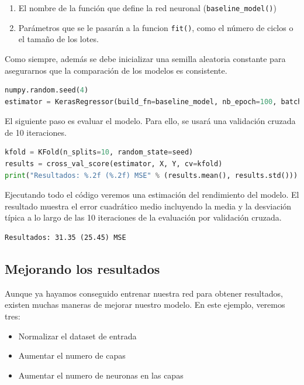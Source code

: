 \begin{enumerate}[noitemsep]
\item El nombre de la función que define la red neuronal (\lstinline{baseline_model()})
\item Parámetros que se le pasarán a la funcion \lstinline{fit()}, como el número de ciclos o el tamaño de los lotes.
\end{enumerate}
Como siempre, además se debe inicializar una semilla aleatoria constante para asegurarnos que la comparación de los modelos es consistente.
\begin{lstlisting}[language=Python]
numpy.random.seed(4)
estimator = KerasRegressor(build_fn=baseline_model, nb_epoch=100, batch_size=5, verbose=0)
\end{lstlisting}
El siguiente paso es evaluar el modelo. Para ello, se usará una validación cruzada de 10 iteraciones.
\begin{lstlisting}[language=Python]
kfold = KFold(n_splits=10, random_state=seed)
results = cross_val_score(estimator, X, Y, cv=kfold)
print("Resultados: %.2f (%.2f) MSE" % (results.mean(), results.std()))
\end{lstlisting}
Ejecutando todo el código veremos una estimación del rendimiento del modelo. El resultado muestra el error cuadrático medio incluyendo la media y la desviación típica a lo largo de las 10 iteraciones de la evaluación por validación cruzada.
\begin{lstlisting}
Resultados: 31.35 (25.45) MSE
\end{lstlisting}
\subsection{Mejorando los resultados}
Aunque ya hayamos conseguido entrenar nuestra red para obtener resultados, existen muchas maneras de mejorar nuestro modelo. En este ejemplo, veremos tres:
\begin{itemize}[noitemsep]
\item Normalizar el dataset de entrada
\item Aumentar el numero de capas
\item Aumentar el numero de neuronas en las capas
\end{itemize}

